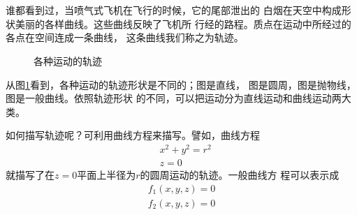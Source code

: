 \section[轨迹]{}\label{sec:01.05}

谁都看到过，当喷气式飞机在飞行的时候，它的尾部泄出的
白烟在天空中构成形状美丽的各样曲线。这些曲线反映了飞机所
行经的路程。质点在运动中所经过的各点在空间连成一条曲线，
这条曲线我们称之为轨迹。

\begin{figure}[!h]
  \hspace{3em}
  \hspace{3em}

  \hspace{3.7em}
  \hspace{1.3em}
  \caption{各种运动的轨迹}
  \label{fig:01.06}
\end{figure}

\clearpage

从图\ref{fig:01.06}看到，各种运动的轨迹形状是不同的；图是直线，
图是圆周，图是抛物线，图是一般曲线。依照轨迹形状
的不同，可以把运动分为直线运动和曲线运动两大类。

如何描写轨迹呢？可利用曲线方程来描写。譬如，曲线方程 \begin{equation*}
  \begin{aligned}
     & x^2+y^2=r^2 \\
     & z=0
  \end{aligned}
\end{equation*}
就描写了在$z=0$平面上半径为$r$的圆周运动的轨迹。一般曲线方
程可以表示成
\begin{equation*}
  \begin{aligned}
    f_1\left(x,y,z\right)=0 \\
    f_2\left(x,y,z\right)=0
  \end{aligned}
\end{equation*}

